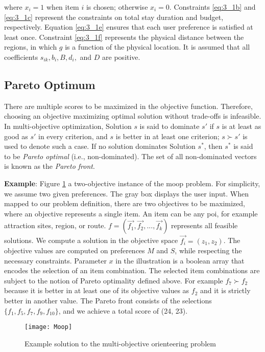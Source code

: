 where $x_i = 1$ when item $i$ is chosen; otherwise $x_i = 0$. 
Constraints \ref{eq:3_1b} and \ref{eq:3_1c} represent the constraints on total stay duration and budget, respectively. Equation \ref{eq:3_1e} ensures that each user preference is satisfied at least once. Constraint \ref{eq:3_1f} represents the physical distance between the regions, in which $g$ is a function of the physical location. It is assumed that all coefficients $s_{ik}, b_{i}, B, d_i,$ and $D$ are positive. 

\subsection*{Pareto Optimum}
There are multiple scores to be maximized in the objective function. Therefore, choosing an objective maximizing optimal solution without trade-offs is infeasible. In multi-objective optimization, Solution $s$ is said to dominate $s'$ if $s$ is at least as good as $s'$ in every criterion, and $s$ is better in at least one criterion; $s \succ s'$ is used to denote such a case. If no solution dominates Solution $s^*$, then $s^*$ is said to be \textit{Pareto optimal} (i.e., non-dominated). The set of all non-dominated vectors is known as the \textit{Pareto front}.

\textbf{Example}:
Figure \ref{fig:moopsample} a two-objective instance of the \gls{moop} problem. For simplicity, we assume two given preferences. The gray box displays the user input. When mapped to our problem definition, there are two objectives to be maximized, where an objective represents a single item. An item can be any \gls{poi}, for example attraction sites, region, or route. $f = (\Vec{f_1}, \Vec{f_2}, ... ,\Vec{f_k})$ represents all feasible solutions. We compute a solution in the objective space $\Vec{f_i} = (z_1, z_2)$. The objective values are computed on preferences $M$ and $S$, while respecting the necessary constraints. Parameter $x$ in the illustration is a boolean array that encodes the selection of an item combination. The selected item combinations are subject to the notion of Pareto optimality defined above. For example $f_7 \succ f_2$ because it is better in at least one of its objective values as $f_2$ and it is strictly better in another value. The Pareto front consists of the selections $\{f_1,f_5,f_7,f_9,f_{10}\}$, and we achieve a total score of (24, 23). 


\begin{figure}[ht!]
    \centering
    \texttt{[image: Moop]}
    \caption{Example solution to the multi-objective orienteering problem}
    \label{fig:moopsample}
\end{figure}

